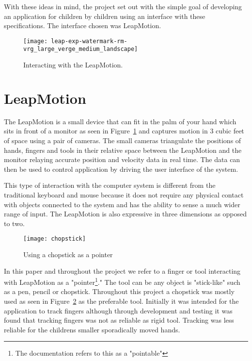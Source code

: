 With these ideas in mind, the project set out with the simple goal of developing an application for children by children using an interface with these specifications. The interface chosen was LeapMotion.


\begin{figure}
\centering
\texttt{[image: leap-exp-watermark-rm-vrg\_large\_verge\_medium\_landscape]}
\caption{Interacting with the LeapMotion. \cite{theverge} }
\label{fig:leapmotionpicture}
\end{figure}

\section{LeapMotion}

The LeapMotion is a small device that can fit in the palm of your hand which sits in front of a monitor as seen in Figure~\ref{fig:leapmotionpicture} and captures motion in 3 cubic feet of space using a pair of cameras. The small cameras triangulate the positions of hands, fingers and tools in their relative space between the LeapMotion and the monitor relaying accurate position and velocity data in real time. The data can then be used to control application by driving the user interface of the system. \cite{leapmotion} 

This type of interaction with the computer system is different from the traditional keyboard and mouse because it does not require any physical contact with objects connected to the system and has the ability to sense a much wider range of input. The LeapMotion is also expressive in three dimensions as opposed to two.

\begin{figure}
\centering
\texttt{[image: chopstick]}
\caption{Using a chopstick as a pointer}
\label{fig:chopstick}
\end{figure}
In this paper and throughout the project we refer to a finger or tool interacting with LeapMotion as a "pointer\footnote{The documentation refers to this as a "pointable"}." The tool can be any object is "stick-like" such as a pen, pencil or chopstick. Throughout this project a chopstick was mostly used as seen in Figure~\ref{fig:chopstick} as the preferable tool. Initially it was intended for the application to track fingers although through development and testing it was found that tracking fingers was not as reliable as rigid tool. Tracking was less reliable for the childrens smaller sporadically moved hands.

